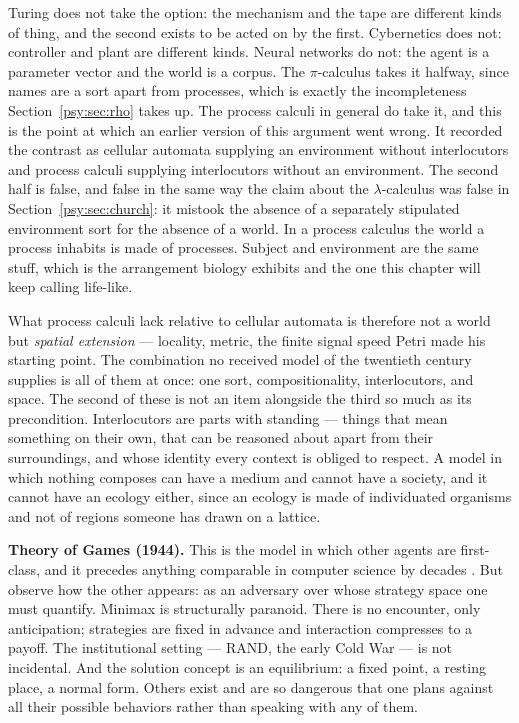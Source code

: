 Turing does not take the option: the mechanism and the tape are
different kinds of thing, and the second exists to be acted on by
the first.
Cybernetics does not: controller and plant are different kinds.
Neural networks do not: the agent is a parameter vector and the
world is a corpus.
The $\pi$-calculus takes it halfway, since names are a sort apart
from processes, which is exactly the incompleteness
Section~\ref{psy:sec:rho} takes up.
The process calculi in general do take it, and this is the point at
which an earlier version of this argument went wrong.
It recorded the contrast as cellular automata supplying an
environment without interlocutors and process calculi supplying
interlocutors without an environment.
The second half is false, and false in the same way the claim about
the $\lambda$-calculus was false in Section~\ref{psy:sec:church}: it
mistook the absence of a separately stipulated environment sort for
the absence of a world.
In a process calculus the world a process inhabits is made of
processes.
Subject and environment are the same stuff, which is the arrangement
biology exhibits and the one this chapter will keep calling
life-like.

What process calculi lack relative to cellular automata is therefore
not a world but \emph{spatial extension} --- locality, metric, the
finite signal speed Petri made his starting point.
The combination no received model of the twentieth century supplies
is all of them at once: one sort, compositionality, interlocutors,
and space.
The second of these is not an item alongside the third so much as
its precondition.
Interlocutors are parts with standing --- things that mean something
on their own, that can be reasoned about apart from their
surroundings, and whose identity every context is obliged to
respect.
A model in which nothing composes can have a medium and cannot have
a society, and it cannot have an ecology either, since an ecology is
made of individuated organisms and not of regions someone has drawn
on a lattice.

\textbf{Theory of Games (1944).}
This is the model in which other agents are first-class, and it
precedes anything comparable in computer science by decades
\cite{vnm1944}.
But observe how the other appears: as an adversary over whose
strategy space one must quantify.
Minimax is structurally paranoid.
There is no encounter, only anticipation; strategies are fixed in
advance and interaction compresses to a payoff.
The institutional setting --- RAND, the early Cold War --- is not
incidental.
And the solution concept is an equilibrium: a fixed point, a resting
place, a normal form.
Others exist and are so dangerous that one plans against all their
possible behaviors rather than speaking with any of them.

